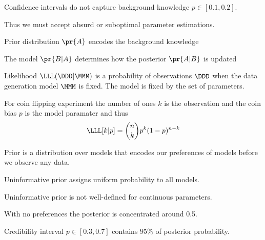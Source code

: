 \documentclass[landscape,footrule]{foils}
\begin{document}




\begin{triangles}
\item Confidence intervals do not capture background knowledge $p\in[0.1,0.2]$. 
\item Thus we must accept absurd or suboptimal parameter estimations. 
\end{triangles}




\vspace*{1cm}
\begin{triangles}
\item Prior distribution $\pr{A}$ encodes the background knowledge
\item The model $\pr{B|A}$  determines how the posterior $\pr{A|B}$ is updated 
\end{triangles}


Likelihood $\LLL(\DDD|\MMM)$ is a probability of observations $\DDD$ when the data generation model $\MMM$ is fixed.
The model is fixed by the set of parameters.

For coin flipping experiment the number of ones $k$ is the observation and the coin bias $p$ is the model paramater and thus
\begin{align*}
\LLL[k|p]=\binom{n}{k}p^k(1-p)^{n-k}
\end{align*}

Prior is a distribution over models that encodes our preferences of models before we observe any data.
\begin{triangles}
\item Uninformative prior assigns uniform probability to all models.
\item Uninformative prior is not well-defined for continuous parameters.  
\end{triangles}
   


\vspace*{-0.5cm}

\begin{triangles}
\item With no preferences the posterior is concentrated around 0.5.
\item Credibility interval $p\in[0.3,0.7]$ contains $95\%$ of posterior probability.
\end{triangles}
\end{document}
